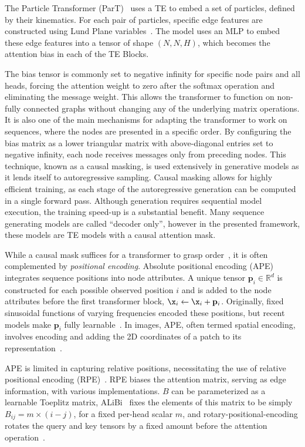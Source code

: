 The Particle Transformer (ParT)~\cite{ParticleTransformerJet} uses a TE to embed a set of particles, defined by their kinematics.
For each pair of particles, specific edge features are constructed using Lund Plane variables~\cite{LundJetPlane}.
The model uses an MLP to embed these edge features into a tensor of shape $(N, N, H)$, which becomes the attention bias in each of the TE Blocks.

The bias tensor is commonly set to negative infinity for specific node pairs and all heads, forcing the attention weight to zero after the softmax operation and eliminating the message weight. This allows the transformer to function on non-fully connected graphs without changing any of the underlying matrix operations.
It is also one of the main mechanisms for adapting the transformer to work on sequences, where the nodes are presented in a specific order.
By configuring the bias matrix as a lower triangular matrix with above-diagonal entries set to negative infinity, each node receives messages only from preceding nodes.
This technique, known as a causal masking, is used extensively in generative models as it lends itself to autoregressive sampling.
Causal masking allows for highly efficient training, as each stage of the autoregressive generation can be computed in a single forward pass.
Although generation requires sequential model execution, the training speed-up is a substantial benefit.
Many sequence generating models are called ``decoder only'', however in the presented framework, these models are TE models with a causal attention mask.

While a causal mask suffices for a transformer to grasp order~\cite{TransformerLanguageModels}, it is often complemented by \textit{positional encoding}.
Absolute positional encoding (APE) integrates sequence positions into node attributes.
A unique tensor $\mathbf{p}_i \in \mathbb{R}^{d}$ is constructed for each possible observed position $i$ and is added to the node attributes before the first transformer block, $\x_i \leftarrow \x_i + \mathbf{p}_i$.
Originally, fixed sinusoidal functions of varying frequencies encoded these positions, but recent models make $\mathbf{p}_i$ fully learnable~\cite{GPT}.
In images, APE, often termed spatial encoding, involves encoding and adding the 2D coordinates of a patch to its representation~\cite{VisionTransformer}.

APE is limited in capturing relative positions, necessitating the use of relative positional encoding (RPE)~\cite{SelfAttentionRelativePosition}.
RPE biases the attention matrix, serving as edge information, with various implementations.
$B$ can be parameterized as a learnable Toeplitz matrix, ALiBi~\cite{ALIBI} fixes the elements of this matrix to be simply $B_{ij} = m\times(i - j)$, for a fixed per-head scalar $m$, and rotary-positional-encoding rotates the query and key tensors by a fixed amount before the attention operation~\cite{RoFormerEnhancedTransformer}.

